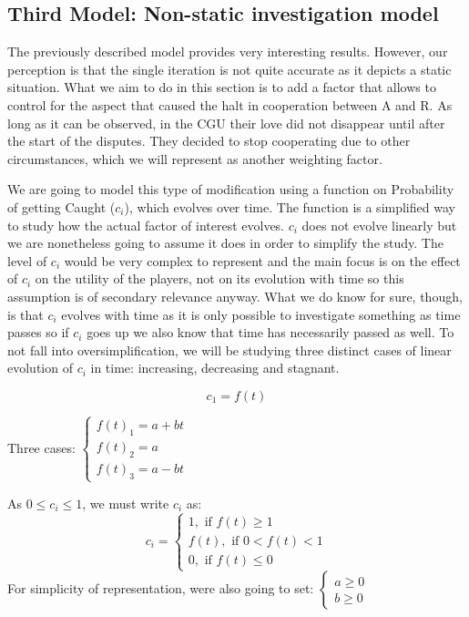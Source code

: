 \documentclass[11pt, a4paper]{article}
\begin{document}
\subsection*{Third Model: Non-static investigation model}

The previously described model provides very interesting results. However, our perception is that the single iteration is not quite accurate as it depicts a static situation. What we aim to do in this section is to add a factor that allows to control for the aspect that caused the halt in cooperation between A and R. As long as it can be observed, in the CGU their love did not disappear until after the start of the disputes. They decided to stop cooperating due to other circumstances, which we will represent as another weighting factor.

We are going to model this type of modification using a function on Probability of getting Caught ($c_i$), which evolves over time. The function is a simplified way to study how the actual factor of interest evolves. $c_i$ does not evolve linearly but we are nonetheless going to assume it does in order to simplify the study. The level of $c_i$
would be very complex to represent and the main focus is on the effect of $c_i$ on the utility of the players, not on its evolution with time so this assumption is of secondary
relevance anyway. What we do know for sure, though, is that $c_i$ evolves with time as it is only possible to investigate something as time passes so if $c_i$ goes up we also know
that time has necessarily passed as well. To not fall into oversimplification, we will be studying three distinct cases of linear evolution of $c_i$ in time: increasing, decreasing and stagnant.

$$
c_1=f(t)
$$

Three cases: $\left\{\begin{array}{l}f(t)_1=a+b t \\ 
f(t)_2=a \\
f(t)_3=a-b t\end{array}\right.$

As $0 \leqslant c_i \leqslant 1$, we must write $c_i$ as:
$$
c_i=\left\{\begin{array}{l}
1, \text { if } f(t) \geqslant 1 \\
f(t), \text { if } 0<f(t)<1 \\
0, \text { if } f(t) \leqslant 0
\end{array}\right.
$$
For simplicity of representation, were also going to set: $\left\{\begin{array}{l}a \geqslant 0 \\ b \geqslant 0\end{array}\right.$
\end{document}
